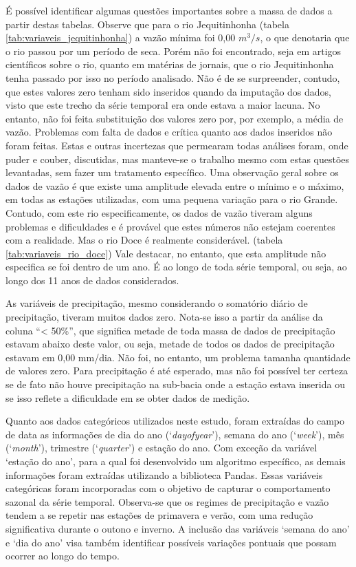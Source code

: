 É possível identificar algumas questões importantes sobre a massa de dados a partir destas tabelas. Observe que para o rio Jequitinhonha (tabela \ref{tab:variaveis_jequitinhonha}) a vazão mínima foi 0,00 $m^3/s$, o que denotaria que o rio passou por um período de seca. Porém não foi encontrado, seja em artigos científicos sobre o rio, quanto em matérias de jornais, que o rio Jequitinhonha tenha passado por isso no período analisado. Não é de se surpreender, contudo, que estes valores zero tenham sido inseridos quando da imputação dos dados, visto que este trecho da série temporal era onde estava a maior lacuna. No entanto, não foi feita substituição dos valores zero por, por exemplo, a média de vazão. Problemas com falta de dados e crítica quanto aos dados inseridos não foram feitas. Estas e outras incertezas que permearam todas análises foram, onde puder e couber, discutidas, mas manteve-se o trabalho mesmo com estas questões levantadas, sem fazer um tratamento específico. Uma observação geral sobre os dados de vazão é que existe uma amplitude elevada entre o mínimo e o máximo, em todas as estações utilizadas, com uma pequena variação para o rio Grande. Contudo, com este rio especificamente, os dados de vazão tiveram alguns problemas e dificuldades e é provável que estes números não estejam coerentes com a realidade. Mas o rio Doce é realmente considerável. (tabela \ref{tab:variaveis_rio_doce}) Vale destacar, no entanto, que esta amplitude não especifica se foi dentro de um ano. É ao longo de toda série temporal, ou seja, ao longo dos 11 anos de dados considerados.

As variáveis de precipitação, mesmo considerando o somatório diário de precipitação, tiveram muitos dados zero. Nota-se isso a partir da análise da coluna ``< 50\%'', que significa metade de toda massa de dados de precipitação estavam abaixo deste valor, ou seja, metade de todos os dados de precipitação estavam em 0,00 mm/dia. Não foi, no entanto, um problema tamanha quantidade de valores zero. Para precipitação é até esperado, mas não foi possível ter certeza se de fato não houve precipitação na sub-bacia onde a estação estava inserida ou se isso reflete a dificuldade em se obter dados de medição.

Quanto aos dados categóricos utilizados neste estudo, foram extraídas do campo de data as informações de dia do ano (`\textit{dayofyear}'), semana do ano (`\textit{week}'), mês (`\textit{month}'), trimestre (`\textit{quarter}') e estação do ano. Com exceção da variável `estação do ano', para a qual foi desenvolvido um algoritmo específico, as demais informações foram extraídas utilizando a biblioteca Pandas.\cite{mckinney2011pandas} Essas variáveis categóricas foram incorporadas com o objetivo de capturar o comportamento sazonal da série temporal. Observa-se que os regimes de precipitação e vazão tendem a se repetir nas estações de primavera e verão, com uma redução significativa durante o outono e inverno. A inclusão das variáveis `semana do ano' e `dia do ano' visa também identificar possíveis variações pontuais que possam ocorrer ao longo do tempo.

